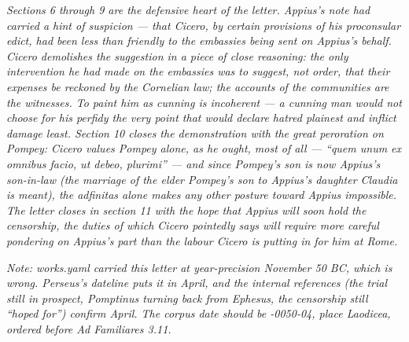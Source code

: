\textit{Sections 6 through 9 are the defensive heart
of the letter. Appius's note had carried a hint of
suspicion --- that Cicero, by certain provisions of
his proconsular edict, had been less than friendly to
the embassies being sent on Appius's behalf. Cicero
demolishes the suggestion in a piece of close
reasoning: the only intervention he had made on the
embassies was to suggest, not order, that their
expenses be reckoned by the Cornelian law; the accounts
of the communities are the witnesses. To paint him as
cunning is incoherent --- a cunning man would not
choose for his perfidy the very point that would
declare hatred plainest and inflict damage least.
Section 10 closes the demonstration with the great
peroration on Pompey: Cicero values Pompey alone, as
he ought, most of all --- ``\textit{quem unum ex
omnibus facio, ut debeo, plurimi}'' --- and since
Pompey's son is now Appius's son-in-law (the marriage
of the elder Pompey's son to Appius's daughter
Claudia is meant), the \textit{adfinitas} alone makes
any other posture toward Appius impossible. The
letter closes in section 11 with the hope that Appius
will soon hold the censorship, the duties of which
Cicero pointedly says will require more careful
pondering on Appius's part than the labour Cicero is
putting in for him at Rome.}

\textit{Note: \textit{works.yaml} carried this letter
at year-precision November 50 BC, which is wrong.
Perseus's dateline puts it in April, and the internal
references (the trial still in prospect, Pomptinus
turning back from Ephesus, the censorship still
``hoped for'') confirm April. The corpus date should
be \textit{-0050-04}, place Laodicea, ordered before
\textit{Ad Familiares} 3.11.}
